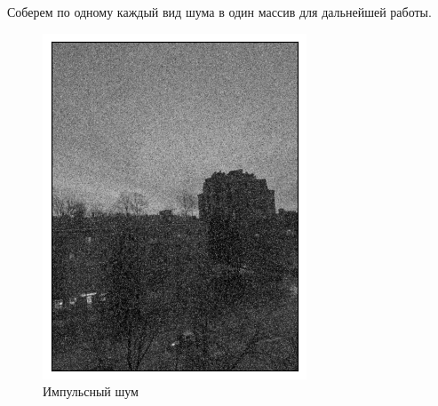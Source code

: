\documentclass[a4paper,12pt]{article}
\begin{document}
Соберем по одному каждый вид шума в один массив для дальнейшей работы.
\begin{figure}[H]
    \begin{minipage}{0.49\textwidth}
        \centering \includegraphics[width=\textwidth]{results/sap.png}
        \caption{Импульсный шум}
    \end{minipage}\hfill
    \begin{minipage}{0.49\textwidth}

\end{minipage}
\end{figure}
\end{document}
